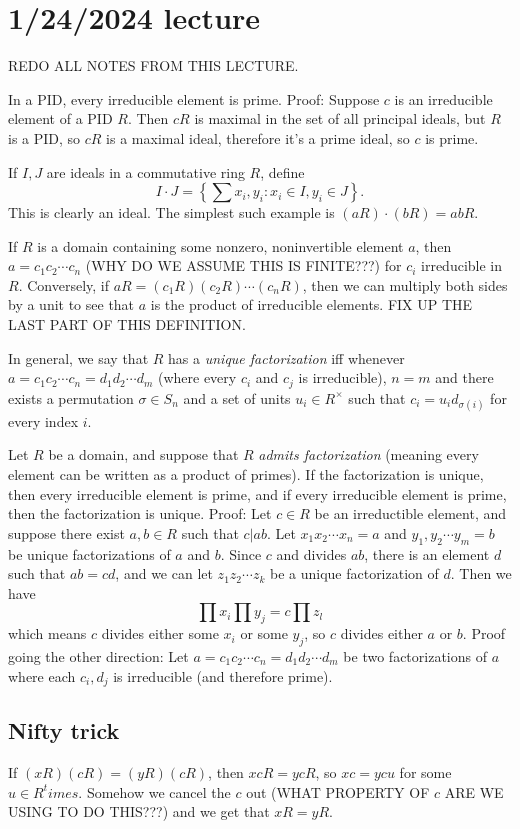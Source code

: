 \documentclass[12pt]{article}
\begin{document}
\section{1/24/2024 lecture}
REDO ALL NOTES FROM THIS LECTURE.
\par
In a PID, every irreducible element is prime. Proof: Suppose $c$ is an irreducible element of a PID $R$. Then $cR$ is maximal in the set of all principal ideals, but $R$ is a PID, so $cR$ is a maximal ideal, therefore it's a prime ideal, so $c$ is prime.
\par
If $I,J$ are ideals in a commutative ring $R$, define
\[ I \cdot J = \left\{ \sum x_i, y_i : x_i \in I, y_i \in J \right\}. \]
This is clearly an ideal. The simplest such example is $(aR)\cdot (bR)=abR$.
\par
If $R$ is a domain containing some nonzero, noninvertible element $a$, then $a=c_1 c_2 \cdots c_n$ (WHY DO WE ASSUME THIS IS FINITE???) for $c_i$ irreducible in $R$. Conversely, if $aR=(c_1 R) (c_2 R) \cdots (c_n R)$, then we can multiply both sides by a unit to see that $a$ is the product of irreducible elements. FIX UP THE LAST PART OF THIS DEFINITION.
\par
In general, we say that $R$ has a \textit{unique factorization} iff whenever $a = c_1 c_2 \cdots c_n = d_1 d_2 \cdots d_m$ (where every $c_i$ and $c_j$ is irreducible), $n=m$ and there exists a permutation $\sigma \in S_n$ and a set of units $u_i \in R^\times$ such that $c_i = u_i d_{\sigma(i)}$ for every index $i$.
\par
Let $R$ be a domain, and suppose that $R$ \textit{admits factorization} (meaning every element can be written as a product of primes). If the factorization is unique, then every irreducible element is prime, and if every irreducible element is prime, then the factorization is unique. Proof: Let $c \in R$ be an irreductible element, and suppose there exist $a,b \in R$ such that $c|ab$. Let $x_1 x_2 \cdots x_n = a$ and $y_1, y_2 \cdots y_m = b$ be unique factorizations of $a$ and $b$. Since $c$ and divides $ab$, there is an element $d$ such that $ab=cd$, and we can let $z_1 z_2 \cdots z_k$ be a unique factorization of $d$. Then we have
\[ \prod x_i \prod y_j = c \prod z_l \]
which means $c$ divides either some $x_i$ or some $y_j$, so $c$ divides either $a$ or $b$. Proof going the other direction: Let $a=c_1 c_2 \cdots c_n = d_1 d_2 \cdots d_m$ be two factorizations of $a$ where each $c_i, d_j$ is irreducible (and therefore prime).

\subsection{Nifty trick}
If $(xR)(cR)=(yR)(cR)$, then $xcR=ycR$, so $xc=ycu$ for some $u \in R^times$. Somehow we cancel the $c$ out (WHAT PROPERTY OF $c$ ARE WE USING TO DO THIS???) and we get that $xR=yR$.
\end{document}
